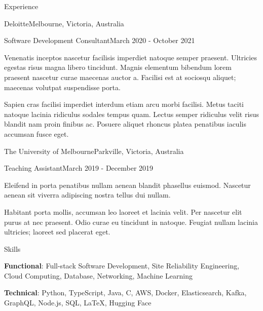 \documentclass{cv}
\begin{document}
\begin{cvsection}{Experience}
\begin{cvheading}{Deloitte}{Melbourne, Victoria, Australia}
\begin{cvsubheading}{Software Development Consultant}{March 2020 - October 2021}
\item Venenatis inceptos nascetur facilisis imperdiet natoque semper praesent. Ultricies egestas risus magna libero tincidunt. Magnis elementum bibendum lorem praesent nascetur curae maecenas auctor a. Facilisi est at sociosqu aliquet; maecenas volutpat suspendisse porta.
\item Sapien cras facilisi imperdiet interdum etiam arcu morbi facilisi. Metus taciti natoque lacinia ridiculus sodales tempus quam. Lectus semper ridiculus velit risus blandit nam proin finibus ac. Posuere aliquet rhoncus platea penatibus iaculis accumsan fusce eget.
\end{cvsubheading}
\end{cvheading}

\begin{cvheading}{The University of Melbourne}{Parkville, Victoria, Australia}
\begin{cvsubheading}{Teaching Assistant}{March 2019 - December 2019}
\item Eleifend in porta penatibus nullam aenean blandit phasellus euismod. Nascetur aenean sit viverra adipiscing nostra tellus dui nullam.
\item Habitant porta mollis, accumsan leo laoreet et lacinia velit. Per nascetur elit purus at nec praesent. Odio curae eu tincidunt in natoque. Feugiat nullam lacinia ultricies; laoreet sed placerat eget.
\end{cvsubheading}
\end{cvheading}

\end{cvsection}

\begin{cvsection}{Skills}
\item \textbf{Functional}: Full-stack Software Development, Site Reliability Engineering, Cloud Computing, Database, Networking, Machine Learning
\item \textbf{Technical}: Python, TypeScript, Java, C, AWS, Docker, Elasticsearch, Kafka, GraphQL, Node.js, SQL, \LaTeX, Hugging Face
\end{cvsection}
\end{document}
